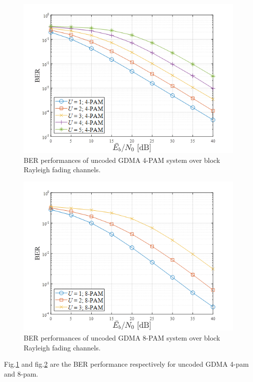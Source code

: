 \begin{figure}[t!]
 \centering
 \includegraphics[width=15cm]{fig/gdma_4_PAM_implement.png}
 \caption{BER performances of uncoded GDMA 4-PAM system over block Rayleigh fading channels.}
 \label{fig:4_pam_implementation}
\end{figure}

\begin{figure}[t!]
 \centering
 \includegraphics[width=15cm]{fig/gdma_8_PAM_implement.png}
 \caption{BER performances of uncoded GDMA 8-PAM system over block Rayleigh fading channels.}
 \label{fig:8_pam_implementation}
\end{figure}

Fig.\ref{fig:4_pam_implementation} and fig.\ref{fig:8_pam_implementation} are the BER performance respectively for uncoded GDMA 4-pam and 8-pam.


